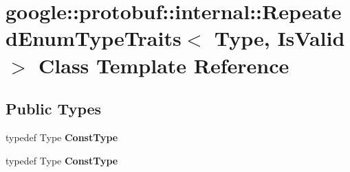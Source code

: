 \hypertarget{classgoogle_1_1protobuf_1_1internal_1_1RepeatedEnumTypeTraits}{}\section{google\+:\+:protobuf\+:\+:internal\+:\+:Repeated\+Enum\+Type\+Traits$<$ Type, Is\+Valid $>$ Class Template Reference}
\label{classgoogle_1_1protobuf_1_1internal_1_1RepeatedEnumTypeTraits}
\subsection*{Public Types}
\begin{DoxyCompactItemize}
\item 
\mbox{\label{classgoogle_1_1protobuf_1_1internal_1_1RepeatedEnumTypeTraits_a4c0ab85f2bf743b68c8dfd8e323c25bf}} 
typedef Type {\bfseries Const\+Type}
\item 
\mbox{\label{classgoogle_1_1protobuf_1_1internal_1_1RepeatedEnumTypeTraits_a4c0ab85f2bf743b68c8dfd8e323c25bf}} 
typedef Type {\bfseries Const\+Type}
\end{DoxyCompactItemize}
